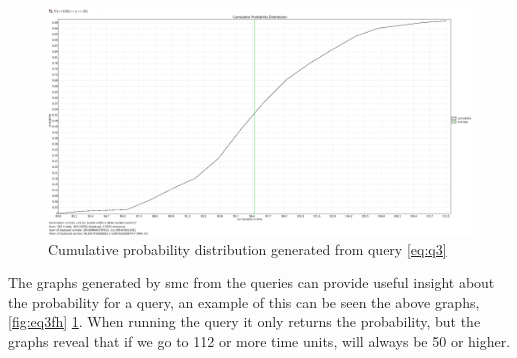 \begin{figure}[!h]
	\includegraphics[width=\textwidth]{graphics/eq3cpd.png}
	\caption{Cumulative probability distribution generated from query \ref{eq:q3}}
	\label{fig:eq3cpd}
\end{figure}

The graphs generated by \gls{smc} from the queries can provide useful insight about the probability for a query, an example of this can be seen the above graphs, \cref{fig:eq3fh} \cref{fig:eq3cpd}. 
When running the query it only returns the probability, but the graphs reveal that if we go to 112 or more time units,  will always be 50 or higher.
